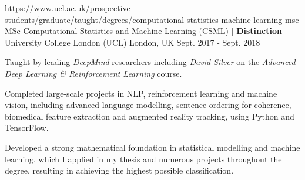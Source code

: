 

\begin{cventries}


  \cventry
    {https://www.ucl.ac.uk/prospective-students/graduate/taught/degrees/computational-statistics-machine-learning-msc}
    {MSc Computational Statistics and Machine Learning (CSML) | \textbf{Distinction}} %
    {University College London (UCL)} %
    {London, UK} %
    {Sept. 2017 - Sept. 2018} %
    {
      \begin{cvitems} %
        \item {Taught by leading \emph{DeepMind} researchers including \emph{David Silver} on the \emph{Advanced Deep Learning \& Reinforcement Learning} course.}
        \item {Completed large-scale projects in NLP, reinforcement learning and machine vision, including advanced language modelling, sentence ordering for coherence, biomedical feature extraction and augmented reality tracking, using Python and TensorFlow.}
        \item {Developed a strong mathematical foundation in statistical modelling and machine learning, which I applied in my thesis and numerous projects throughout the degree, resulting in achieving the highest possible classification.}
      \end{cvitems}
    }
    

\end{cventries}
